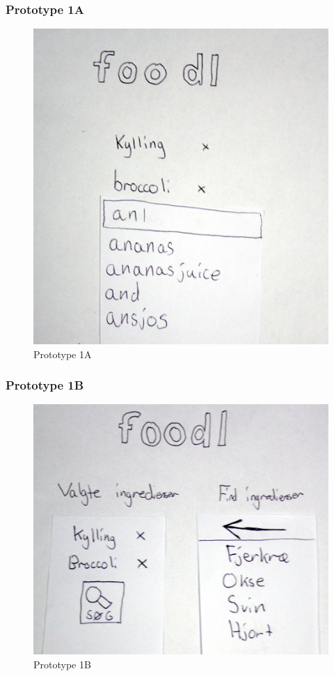 \begin{frame}
	\frametitle{Prototype 1A}
	\begin{figure}
	\centering
	\includegraphics[scale=0.08]{billeder/prototype1a.jpg}
	\caption{Prototype 1A}
	\end{figure}
\end{frame}

\begin{frame}
	\frametitle{Prototype 1B}
	\begin{figure}
	\centering
	\includegraphics[scale=0.08]{billeder/prototype1b.jpg}
	\caption{Prototype 1B}
	\end{figure}
\end{frame}

